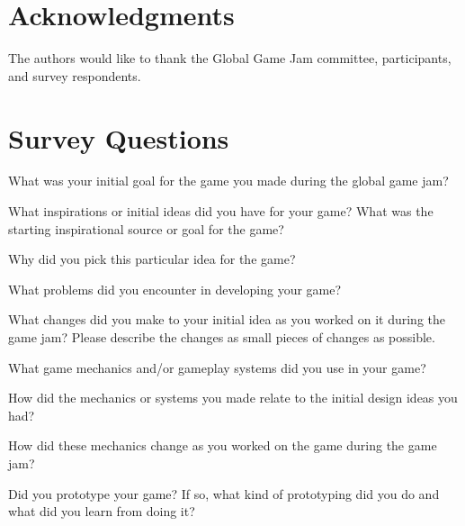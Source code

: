 \documentclass{sig-alternate}
\begin{document}
\section{Acknowledgments}
The authors would like to thank the Global Game Jam committee, participants, and survey respondents.








\appendix
\section{Survey Questions}
\label{sec:survey}
\begin{list}{}{\leftmargin=10pt \itemindent=0em \itemsep=0pt}
\item What was your initial goal for the game you made during the global game jam?
\item What inspirations or initial ideas did you have for your game? What was the starting inspirational source or goal for the game?
\item Why did you pick this particular idea for the game?
\item What problems did you encounter in developing your game?
\item What changes did you make to your initial idea as you worked on it during the game jam? Please describe the changes as small pieces of changes as possible.
\item What game mechanics and/or gameplay systems did you use in your game?
\item How did the mechanics or systems you made relate to the initial design ideas you had?
\item How did these mechanics change as you worked on the game during the game jam?
\item Did you prototype your game? If so, what kind of prototyping did you do and what did you learn from doing it?
\end{list}
\end{document}
